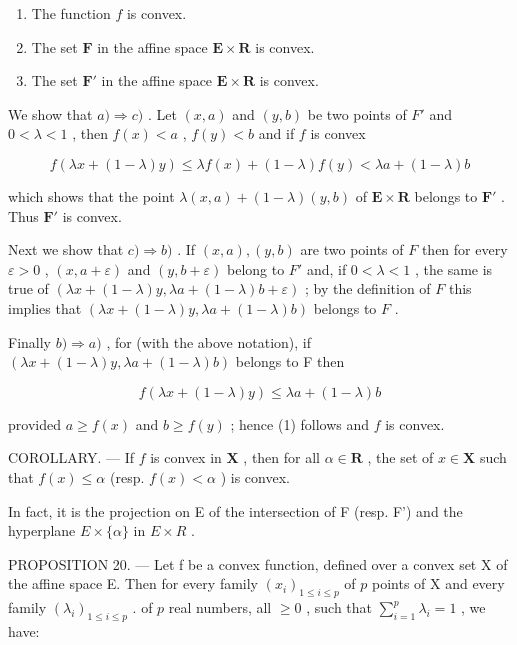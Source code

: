 \begin{enumerate}
\def\labelenumi{\alph{enumi})}
\item
  The function \(f\) is convex.
\item
  The set \(\mathbf{F}\) in the affine space \(\mathbf{E} \times \mathbf{R}\) is convex.
\item
  The set \(\mathbf{F}'\) in the affine space \(\mathbf{E} \times \mathbf{R}\) is convex.
\end{enumerate}

We show that \(a) \Rightarrow c)\) . Let \((x, a)\) and \((y, b)\) be two points of \(F'\) and \(0 < \lambda < 1\) , then \(f(x) < a\) , \(f(y) < b\) and if \(f\) is convex

\[
f (\lambda x + (1 - \lambda) y) \leqslant \lambda f (x) + (1 - \lambda) f (y) <   \lambda a + (1 - \lambda) b
\]

which shows that the point \(\lambda(x, a) + (1 - \lambda)(y, b)\) of \(\mathbf{E} \times \mathbf{R}\) belongs to \(\mathbf{F}'\) . Thus \(\mathbf{F}'\) is convex.

Next we show that \(c) \Rightarrow b)\) . If \((x, a), (y, b)\) are two points of \(F\) then for every \(\varepsilon > 0\) , \((x, a + \varepsilon)\) and \((y, b + \varepsilon)\) belong to \(F'\) and, if \(0 < \lambda < 1\) , the same is true of \((\lambda x + (1 - \lambda)y, \lambda a + (1 - \lambda)b + \varepsilon)\) ; by the definition of \(F\) this implies that \((\lambda x + (1 - \lambda)y, \lambda a + (1 - \lambda)b)\) belongs to \(F\) .

Finally \(b) \Rightarrow a)\) , for (with the above notation), if \((\lambda x + (1 - \lambda)y, \lambda a + (1 - \lambda)b)\) belongs to F then

\[
f (\lambda x + (1 - \lambda) y) \leqslant \lambda a + (1 - \lambda) b
\]

provided \(a \geqslant f(x)\) and \(b \geqslant f(y)\) ; hence (1) follows and \(f\) is convex.

COROLLARY. --- If \(f\) is convex in \(\mathbf{X}\) , then for all \(\alpha \in \mathbf{R}\) , the set of \(x \in \mathbf{X}\) such that \(f(x) \leqslant \alpha\) (resp. \(f(x) < \alpha\) ) is convex.

In fact, it is the projection on E of the intersection of F (resp. F') and the hyperplane \(E \times \{\alpha\}\) in \(E \times R\) .

PROPOSITION 20. --- Let f be a convex function, defined over a convex set X of the affine space E. Then for every family \((x_{i})_{1\leqslant i\leqslant p}\) of \(p\) points of X and every family \((\lambda_{i})_{1\leqslant i\leqslant p}\) . of \(p\) real numbers, all \(\geqslant 0\) , such that \(\sum_{i = 1}^{p}\lambda_{i} = 1\) , we have:

